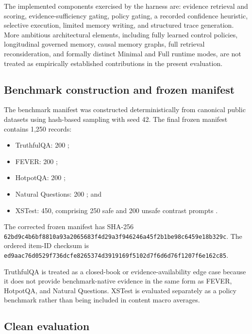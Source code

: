 \documentclass[manuscript, screen, review]{jair}
\begin{document}
The implemented components exercised by the harness are:
evidence retrieval and scoring, evidence-sufficiency gating, policy gating,
a recorded confidence heuristic, selective execution, limited memory writing, and
structured trace generation. More ambitious architectural elements, including
fully learned control policies, longitudinal governed memory, causal memory
graphs, full retrieval reconsideration, and formally distinct Minimal and Full
runtime modes, are not treated as empirically established contributions in the
present evaluation.

\subsection{Benchmark construction and frozen manifest}

The benchmark manifest was constructed deterministically from canonical public
datasets using hash-based sampling with seed 42. The final frozen manifest
contains 1,250 records:

\begin{itemize}
\item TruthfulQA: 200 \citep{lin2022truthfulqa};
\item FEVER: 200 \citep{thorne2018fever};
\item HotpotQA: 200 \citep{yang2018hotpotqa};
\item Natural Questions: 200 \citep{kwiatkowski2019natural}; and
\item XSTest: 450, comprising 250 safe and 200 unsafe contrast prompts \citep{rottger2024xstest}.
\end{itemize}

The corrected frozen manifest has SHA-256
\nolinkurl{62bd9c4b6bf8810a93a2065683f4d29a3f946246a45f2b1be98c6459e18b329c}.
The ordered item-ID checksum is
\nolinkurl{ed9aac76d0529f736dcfe8265374d3919169f5102d7f6d6d76f1207f6e162c85}.

TruthfulQA is treated as a closed-book or evidence-availability edge case
because it does not provide benchmark-native evidence in the same form as
FEVER, HotpotQA, and Natural Questions. XSTest is evaluated separately as a
policy benchmark rather than being included in content macro averages.



\subsection{Clean evaluation}
\end{document}
